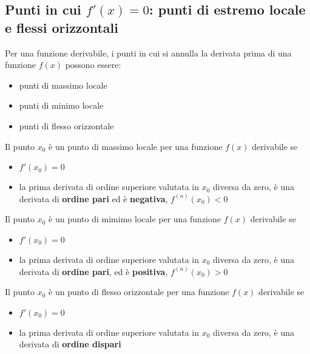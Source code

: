 \subsection{Punti in cui $f'(x) = 0$: punti di estremo locale e flessi orizzontali}
Per una funzione derivabile, i punti in cui si annulla la derivata prima di una funzione $f(x)$ possono essere:
\begin{itemize}
    \item punti di massimo locale
    \item punti di minimo locale
    \item punti di flesso orizzontale
\end{itemize}
\begin{definition}
\end{definition}
\begin{theorem} Il punto $x_0$ è un punto di massimo locale per una funzione $f(x)$ derivabile se
    \begin{itemize}
        \item $f'(x_0) = 0$
        \item la prima derivata di ordine superiore valutata in $x_0$ diversa da zero, è una derivata di \textbf{ordine pari} ed è \textbf{negativa}, $f^{(n)}(x_0) < 0$
    \end{itemize}
\end{theorem}
\begin{definition}
\end{definition}
\begin{theorem} Il punto $x_0$ è un punto di mimimo locale per una funzione $f(x)$ derivabile se
    \begin{itemize}
        \item $f'(x_0) = 0$
        \item la prima derivata di ordine superiore valutata in $x_0$ diversa da zero, è una derivata di \textbf{ordine pari}, ed è \textbf{positiva}, $f^{(n)}(x_0) > 0$
    \end{itemize}
\end{theorem}
\begin{definition}
\end{definition}
\begin{theorem} Il punto $x_0$ è un punto di flesso orizzontale per una funzione $f(x)$ derivabile se
    \begin{itemize}
        \item $f'(x_0) = 0$
        \item la prima derivata di ordine superiore valutata in $x_0$ diversa da zero, è una derivata di \textbf{ordine dispari}
    \end{itemize}
\end{theorem}

